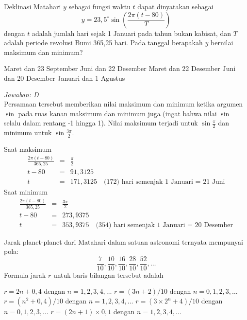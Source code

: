 \documentclass[11pt,fleqn, a4paper]{exam}
\begin{document}
\begin{questions}
\vspace{0.5cm}
\question Deklinasi Matahari $y$ sebagai fungsi waktu $t$ dapat dinyatakan sebagai 
\begin{equation*}
y = 23,5^{\circ} \sin{\left( \frac{2\pi(t-80)}{T} \right)}
\end{equation*}
dengan $t$ adalah jumlah hari sejak 1 Januari pada tahun bukan kabisat, dan $T$ adalah periode revolusi Bumi 365,25 hari. Pada tanggal berapakah $y$ bernilai maksimum dan minimum?
\begin{choices}
 Maret dan 23 September
 Juni dan 22 Desember
 Maret dan 22 Desember
 Juni dan 20 Desember
 Januari dan 1 Agustus
\end{choices}

\textit{Jawaban: D}\\
Persamaan tersebut memberikan nilai maksimum dan minimum ketika argumen $\sin$ pada ruas kanan maksimum dan minimum juga (ingat bahwa nilai $\sin$ selalu dalam rentang -1 hingga 1). Nilai maksimum terjadi untuk $\sin{\frac{\pi}{2}}$ dan minimum untuk $\sin{\frac{3\pi}{2}}$.

Saat maksimum 
\begin{eqnarray*}
\frac{2\pi(t-80)}{365,25} &=& \frac{\pi}{2}\\
t - 80 &=& 91,3125\\
t &=& 171,3125 \quad \text{(172) hari semenjak 1 Januari = 21 Juni}
\end{eqnarray*}
Saat minimum
\begin{eqnarray*}
\frac{2\pi(t-80)}{365,25} &=& \frac{3\pi}{2}\\
t - 80 &=& 273,9375\\
t &=& 353,9375 \quad \text{(354) hari semenjak 1 Januari = 20 Desember}
\end{eqnarray*}


\vspace{0.5cm}
\question Jarak planet-planet dari Matahari dalam satuan astronomi ternyata mempunyai pola:
\begin{equation*}
\frac{7}{10}, \frac{10}{10}, \frac{16}{10}, \frac{28}{10}, \frac{52}{10}, \dots 
\end{equation*}
Formula jarak $r$ untuk baris bilangan tersebut adalah
\begin{choices}
\choice $r = 2n + 0,4$ dengan $n = 1, 2, 3, 4, \dots$
\choice $r = (3n + 2)/10$ dengan $n = 0, 1, 2, 3, \dots$
\choice $r = (n^2 + 0,4)/10$ dengan $n = 1, 2, 3, 4, \dots$
\choice $r = (3 \times 2^n + 4)/10$ dengan $n = 0, 1, 2, 3, \dots$
\choice $r = (2n + 1) \times 0,1$ dengan $n = 1, 2, 3, 4, \dots$
\end{choices}


\end{questions}
\end{document}

